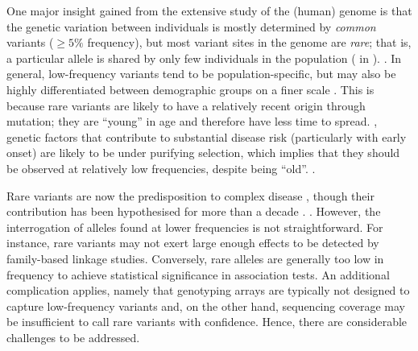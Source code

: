 One major insight gained from the extensive study of the (human) genome is that the genetic variation between individuals is mostly determined by \emph{common} variants (\eg ${\geq 5\%}$ frequency), but most variant sites in the genome are \emph{rare}; that is, a particular allele is shared by only few individuals in the population ( in ).
 \citep{Fu:1995hp}.
In general, low-frequency variants tend to be population-specific, but may also be highly differentiated between demographic groups on a finer scale \citep{Gravel:2011bgb,Bustamante:2011df,Mathieson:2014ig}.
This is because rare variants are likely to have a relatively recent origin through mutation; \ie they are ``young'' in age and therefore have less time to spread.
, genetic factors that contribute to substantial disease risk (particularly with early onset) are likely to be under purifying selection, which implies that they should be observed at relatively low frequencies, \eg despite being ``old''.
 \citep[\eg, see][]{Kryukov:2007ec,Marth:2011bz, Coventry:2010cqa,Keinan:2012kl,Tennessen:2012ck}.


Rare variants are now  the predisposition to complex disease \citep{Bodmer:2008ep,Schork:2009ke,McClellan:2010ksa,Cirulli:2010cza}, though their contribution has been hypothesised for more than a decade \citep{Pritchard:2001hw}.
 \citep{Manolio:2009jp,Gibson:2012kca,Zuk:2014jv}.
However, the interrogation of alleles found at lower frequencies is not straightforward.
For instance, rare variants may not exert large enough effects to be detected by family-based linkage studies.
Conversely, rare alleles are generally too low in frequency to achieve statistical significance in association tests.
An additional complication applies, namely that genotyping arrays are typically not designed to capture low-frequency variants and, on the other hand, sequencing coverage may be insufficient to call rare variants with confidence.
Hence, there are considerable challenges to be addressed.


